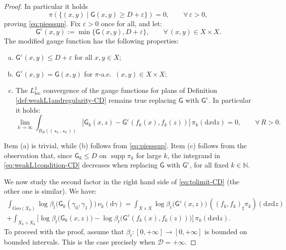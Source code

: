 \documentclass[11pt,a4paper]{article}
\theoremstyle{plain}
\theoremstyle{definition}
\theoremstyle{remark}
\numberwithin{equation}{section}
\newcommand{\N}{\mathbb{N}} %
\DeclareMathOperator{\supp}{\mathrm{supp}}
\newcommand{\ve}{\varepsilon}
\newcommand{\Geo}{\mathrm{Geo}}
\newcommand{\cD}{\mathcal{D}}
\newcommand{\loc}{\mathrm{loc}}
\newcommand{\di}{\mathrm{d}}
\newcommand{\sfG}{\mathsf G}
\begin{document}
\begin{proof}
In particular it holds
\begin{equation}\label{eq:diamleqD-CD}
\pi(\{(x,y)\mid \sfG(x,y) \geq D+\varepsilon\}) = 0, \qquad \forall\, \varepsilon>0,
\end{equation}
proving \eqref{eq:piesssup}. Fix $\ve>0$ once for all, and let:
\begin{equation}
\sfG^{\ve}(x,y):=\min\{\sfG(x,y),D+\ve\}, \qquad \forall\,(x,y)\in X\times X.
\end{equation}
The modified gauge function has the following properties:
\begin{enumerate}[(a)]
\item $\sfG^{\ve}(x,y) \leq D+\ve$ for all $x,y\in X$;
\item $\sfG^{\ve}(x,y) = \sfG(x,y)$ for $\pi$-a.e.\ $(x,y)\in X\times X$;
\item The $L^1_{\loc}$ convergence of the gauge functions for plans of Definition \ref{def:weakL1andregularity-CD} remains true replacing $\sfG$ with $\sfG^{\ve}$. In particular it holds:
\begin{equation}
\lim_{k\to \infty}\int_{B_{R}((\star_k,\star_k))}|\sfG_k(x,z)-\sfG^\ve(f_k(x),f_k(z))| \, \pi_{k}(\di x\di z) =0, \qquad \forall\, R>0.
\end{equation}
\end{enumerate}
Item (a) is trivial, while (b) follows from \eqref{eq:piesssup}. Item (c) follows from the observation that, since  $\sfG_k\leq D$ on $\supp\pi_k$ for large $k$, the integrand in \eqref{eq:weakL1condition-CD} decreases when replacing $\sfG$ with $\sfG^{\ve}$, for all fixed $k\in \N$.

We now study the second factor in the right hand side of \eqref{eq:tolimit-CD} (the other one is similar). We have:
\begin{multline}\label{eq:twoterms-CD}
\int_{\Geo(X_k)} \log\beta_t\big(\sfG_k(\gamma_0,\gamma_1)\big)\,\nu_{k}(\di \gamma)  = \int_{X\times X} \log\beta_t\big(\sfG^{\ve}(x,z)\big)\,((f_k,f_k)_\sharp\pi_{k})(\di x \di z)\\
+\int_{X_k\times X_k} \Big[\log\beta_t \big(\sfG_k(x,z)\big)-\log\beta_t \big(\sfG^{\ve} (f_k(x),f_k(z))\big) \Big]\,\pi_{k}(\di x \di z).
\end{multline}
To proceed with the proof, assume that $\beta_t:[0,+\infty]\to [0,+\infty]$ is bounded on bounded intervals. This is the case precisely when $\cD=+\infty$.


\end{proof}
\end{document}
